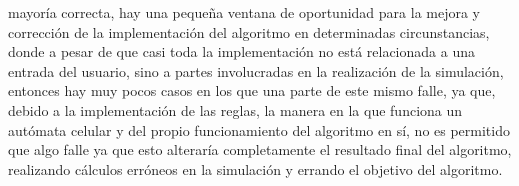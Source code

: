         mayor\'ia correcta, hay una peque\~na ventana de oportunidad
        para la mejora y correcci\'on de la implementaci\'on del
        algoritmo en determinadas circunstancias, donde a pesar de
        que casi toda la implementaci\'on no est\'a relacionada a una entrada del usuario, sino a partes involucradas en la
        realizaci\'on de la simulaci\'on, entonces hay muy pocos casos
        en los que una parte de este mismo falle, ya que, debido a la
        implementaci\'on de las reglas, la manera en la que funciona
        un aut\'omata celular y del propio funcionamiento del
        algoritmo en s\'i, no es permitido que algo falle ya que esto
        alterar\'ia completamente el resultado final del algoritmo,
        realizando c\'alculos err\'oneos en la simulaci\'on y errando el
        objetivo del algoritmo.
